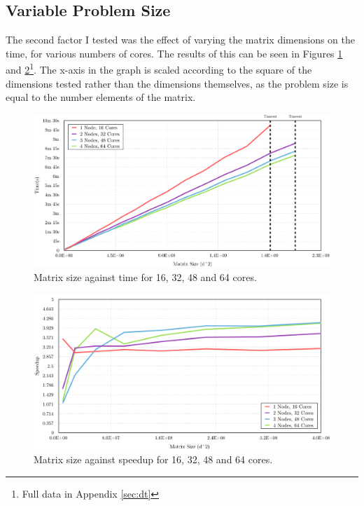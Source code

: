 \documentclass[12pt]{article}
\begin{document}
\subsection{Variable Problem Size}

The second factor I tested was the effect of varying the matrix dimensions on the time, for various numbers of cores. The results of this can be seen in Figures \ref{fig:dimension-time} and \ref{fig:dimension-sp}\footnote{Full data in Appendix \ref{sec:dt}}. The x-axis in the graph is scaled according to the square of the dimensions tested rather than the dimensions themselves, as the problem size is equal to the number elements of the matrix.

\begin{figure}[htbp!]
	\centering\includegraphics[width=\textwidth]{img/dimension-time.pdf}
	\caption{Matrix size against time for 16, 32, 48 and 64 cores.}
	\label{fig:dimension-time}
\end{figure}

\begin{figure}[htbp!]
	\centering\includegraphics[width=\textwidth]{img/dimension-speedup}
	\caption{Matrix size against speedup for 16, 32, 48 and 64 cores.}
	\label{fig:dimension-sp}
\end{figure}
\end{document}
